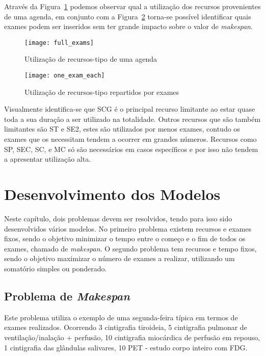 Através da Figura~\ref{fig:full_exams} podemos observar qual a utilização dos recursos provenientes de uma agenda, em conjunto com a Figura~\ref{fig:one_exam_each} torna-se possível identificar quais exames podem ser inseridos sem ter grande impacto sobre o valor de \textit{makespan}.
\begin{figure}[h]
	\centering
	\texttt{[image: full\_exams]}
	\caption{Utilização de recursos-tipo de uma agenda}
	\label{fig:full_exams}
\end{figure}

\begin{figure}[h]
	\centering
	\texttt{[image: one\_exam\_each]}
	\caption{Utilização de recursos-tipo repartidos por exames}
	\label{fig:one_exam_each}
\end{figure}

Visualmente identifica-se que SCG é o principal recurso limitante ao estar quase toda a sua duração a ser utilizado na totalidade. Outros recursos que são também limitantes são ST e SE2, estes são utilizados por menos exames, contudo os exames que os necessitam tendem a ocorrer em grandes números. Recursos como SP, SEC, SC, e MC só são necessários em casos específicos e por isso não tendem a apresentar utilização alta.\\

\chapter{Desenvolvimento dos Modelos}
\label{cha:desenvolvimentos_dos_modelos}

Neste capítulo, dois problemas devem ser resolvidos, tendo para isso sido desenvolvidos vários modelos. No primeiro problema existem recursos e exames fixos, sendo o objetivo minimizar o tempo entre o começo e o fim de todos os exames, chamado de \textit{makespan}. O segundo problema tem recursos e tempo fixos, sendo o objetivo maximizar o número de exames a realizar, utilizando um somatório simples ou ponderado.

\section{Problema de \textit{Makespan}}

Este problema utiliza o exemplo de uma segunda-feira típica em termos de exames realizados. Ocorrendo 3 cintigrafia tiroideia, 5 cintigrafia pulmonar de ventilação/inalação + perfusão, 10 cintigrafia miocárdica de perfusão em repouso, 1 cintigrafia das glândulas salivares, 10 PET - estudo corpo inteiro com FDG.\\

